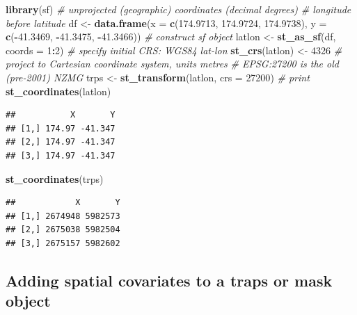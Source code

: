 \documentclass[
]{book}
\newenvironment{Shaded}{\begin{snugshade}}{\end{snugshade}}
\newcommand{\AttributeTok}[1]{\textcolor[rgb]{0.13,0.29,0.53}{#1}}
\newcommand{\CommentTok}[1]{\textcolor[rgb]{0.56,0.35,0.01}{\textit{#1}}}
\newcommand{\DecValTok}[1]{\textcolor[rgb]{0.00,0.00,0.81}{#1}}
\newcommand{\FloatTok}[1]{\textcolor[rgb]{0.00,0.00,0.81}{#1}}
\newcommand{\FunctionTok}[1]{\textcolor[rgb]{0.13,0.29,0.53}{\textbf{#1}}}
\newcommand{\NormalTok}[1]{#1}
\newcommand{\OtherTok}[1]{\textcolor[rgb]{0.56,0.35,0.01}{#1}}
\newcommand{\SpecialCharTok}[1]{\textcolor[rgb]{0.81,0.36,0.00}{\textbf{#1}}}
\begin{document}
\begin{Shaded}
\begin{Highlighting}[]
\FunctionTok{library}\NormalTok{(sf)}
\CommentTok{\# unprojected (geographic) coordinates (decimal degrees) }
\CommentTok{\# longitude before latitude}
\NormalTok{df }\OtherTok{\textless{}{-}} \FunctionTok{data.frame}\NormalTok{(}\AttributeTok{x =} \FunctionTok{c}\NormalTok{(}\FloatTok{174.9713}\NormalTok{, }\FloatTok{174.9724}\NormalTok{, }\FloatTok{174.9738}\NormalTok{), }
                 \AttributeTok{y =} \FunctionTok{c}\NormalTok{(}\SpecialCharTok{{-}}\FloatTok{41.3469}\NormalTok{, }\SpecialCharTok{{-}}\FloatTok{41.3475}\NormalTok{, }\SpecialCharTok{{-}}\FloatTok{41.3466}\NormalTok{))}
\CommentTok{\# construct sf object}
\NormalTok{latlon }\OtherTok{\textless{}{-}} \FunctionTok{st\_as\_sf}\NormalTok{(df, }\AttributeTok{coords =} \DecValTok{1}\SpecialCharTok{:}\DecValTok{2}\NormalTok{)}
\CommentTok{\# specify initial CRS: WGS84 lat{-}lon}
\FunctionTok{st\_crs}\NormalTok{(latlon) }\OtherTok{\textless{}{-}} \DecValTok{4326}  
\CommentTok{\# project to Cartesian coordinate system, units metres}
\CommentTok{\# EPSG:27200 is the old (pre{-}2001) NZMG}
\NormalTok{trps }\OtherTok{\textless{}{-}} \FunctionTok{st\_transform}\NormalTok{(latlon, }\AttributeTok{crs =} \DecValTok{27200}\NormalTok{) }
\CommentTok{\# print}
\FunctionTok{st\_coordinates}\NormalTok{(latlon)  }
\end{Highlighting}
\end{Shaded}

\begin{verbatim}
##           X       Y
## [1,] 174.97 -41.347
## [2,] 174.97 -41.347
## [3,] 174.97 -41.347
\end{verbatim}

\begin{Shaded}
\begin{Highlighting}[]
\FunctionTok{st\_coordinates}\NormalTok{(trps)}
\end{Highlighting}
\end{Shaded}

\begin{verbatim}
##            X       Y
## [1,] 2674948 5982573
## [2,] 2675038 5982504
## [3,] 2675157 5982602
\end{verbatim}

\subsection{Adding spatial covariates to a traps or mask object}\label{adding-spatial-covariates-to-a-traps-or-mask-object}
\end{document}
